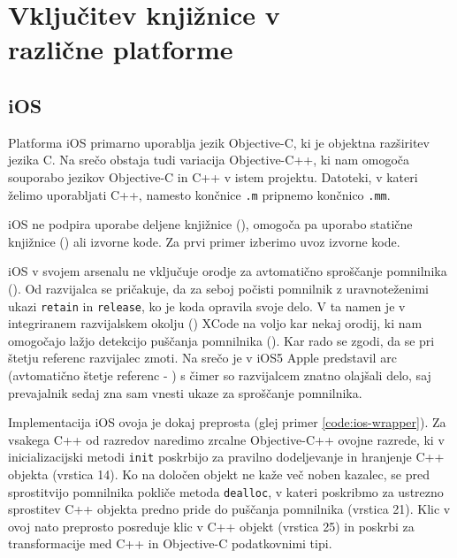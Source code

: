\chapter[Vključitev knjižnice v različne platforme]{Vključitev knjižnice v \\ različne platforme}
\label{chap:cross-platform}

\section{iOS}

Platforma iOS primarno uporablja jezik Objective-C, ki je objektna razširitev jezika C. Na srečo obstaja tudi variacija Objective-C++, ki nam omogoča souporabo jezikov Objective-C in C++ v istem projektu. Datoteki, v kateri želimo uporabljati C++, namesto končnice \texttt{.m} pripnemo končnico \texttt{.mm}.

iOS ne podpira uporabe deljene knjižnice (), omogoča pa uporabo statične knjižnice () ali izvorne kode. Za prvi primer izberimo uvoz izvorne kode.

iOS v svojem arsenalu ne vključuje orodje za avtomatično sproščanje pomnilnika (). Od razvijalca se pričakuje, da za seboj počisti pomnilnik z uravnoteženimi ukazi \texttt{retain} in \texttt{release}, ko je koda opravila svoje delo. V ta namen je v integriranem razvijalskem okolju () XCode na voljo kar nekaj orodij, ki nam omogočajo lažjo detekcijo puščanja pomnilnika (). Kar rado se zgodi, da se pri štetju referenc razvijalec zmoti. Na srečo je v iOS5 Apple predstavil \gls{arc} (avtomatično štetje referenc - ) s čimer so razvijalcem znatno olajšali delo, saj prevajalnik sedaj zna sam vnesti ukaze za sproščanje pomnilnika.

Implementacija iOS ovoja je dokaj preprosta (glej primer \ref{code:ios-wrapper}). Za vsakega C++ od razredov naredimo zrcalne Objective-C++ ovojne razrede, ki v inicializacijski metodi \texttt{init} poskrbijo za pravilno dodeljevanje in hranjenje C++ objekta (vrstica 14). Ko na določen objekt ne kaže več noben kazalec, se pred sprostitvijo pomnilnika pokliče metoda \texttt{dealloc}, v kateri poskribmo za ustrezno sprostitev C++ objekta predno pride do puščanja pomnilnika (vrstica 21). Klic v ovoj nato preprosto posreduje klic v C++ objekt (vrstica 25) in poskrbi za transformacije med C++ in Objective-C podatkovnimi tipi.

